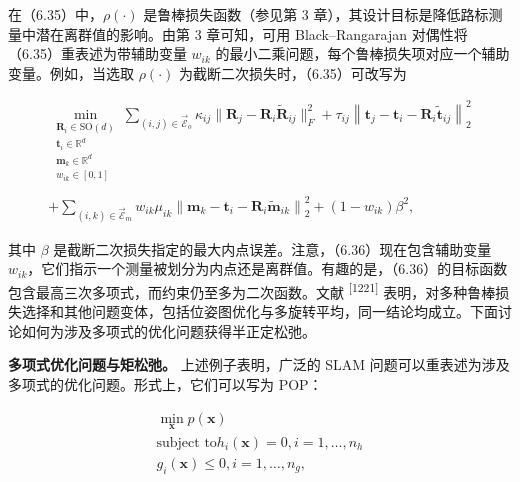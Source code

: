 在（6.35）中，$\rho ( \cdot )$ 是鲁棒损失函数（参见第 3 章），其设计目标是降低路标测量中潜在离群值的影响。由第 3 章可知，可用 Black--Rangarajan 对偶性将（6.35）重表述为带辅助变量 $w _ { i k }$ 的最小二乘问题，每个鲁棒损失项对应一个辅助变量。例如，当选取 $\rho ( \cdot )$ 为截断二次损失时，（6.35）可改写为

\begin{equation}
\begin{array}{l}\underset { \begin{array}{c}\boldsymbol{R}_{i}\in \mathrm{SO}(d)\\ \boldsymbol{t}_{i}\in \mathbb{R}^{d}\\ \boldsymbol{m}_{k}\in \mathbb{R}^{d}\\ w_{ik}\in [0,1 ] \end{array} }{\min}\sum_{(i,j)\in \vec{\mathcal{E}}_{o}}\kappa_{ij}\| \boldsymbol{R}_{j} - \boldsymbol{R}_{i}\tilde{\boldsymbol{R}}_{ij}\|_{F}^{2} + \tau_{ij}\left\| \boldsymbol{t}_{j} - \boldsymbol{t}_{i} - \boldsymbol{R}_{i}\tilde{\boldsymbol{t}}_{ij}\right\|_{2}^{2}\\ \\ +\sum_{(i,k)\in \vec{\mathcal{E}}_{m}}w_{ik}\mu_{ik}\left\| \boldsymbol{m}_{k} - \boldsymbol{t}_{i} - \boldsymbol{R}_{i}\tilde{\boldsymbol{m}}_{ik}\right\|_{2}^{2} + (1 - w_{ik})\beta^{2}, \end{array}\tag{6.36}
\end{equation}

其中 $\beta$ 是截断二次损失指定的最大内点误差。注意，（6.36）现在包含辅助变量 $w _ { i k }$，它们指示一个测量被划分为内点还是离群值。有趣的是，（6.36）的目标函数包含最高三次多项式，而约束仍至多为二次函数。文献 \textsuperscript{[1221]} 表明，对多种鲁棒损失选择和其他问题变体，包括位姿图优化与多旋转平均，同一结论均成立。下面讨论如何为涉及多项式的优化问题获得半正定松弛。

\textbf{多项式优化问题与矩松弛。} 上述例子表明，广泛的 SLAM 问题可以重表述为涉及多项式的优化问题。形式上，它们可以写为 POP：

\begin{equation}
\begin{array}{c} \min _ {\boldsymbol {x}} p (\boldsymbol {x}) \\ \text {subject to} h _ {i} (\boldsymbol {x}) = 0, i = 1, \ldots , n _ {h} \\ g _ {i} (\boldsymbol {x}) \leq 0, i = 1, \ldots , n _ {g}, \end{array}\tag{POP}
\end{equation}

